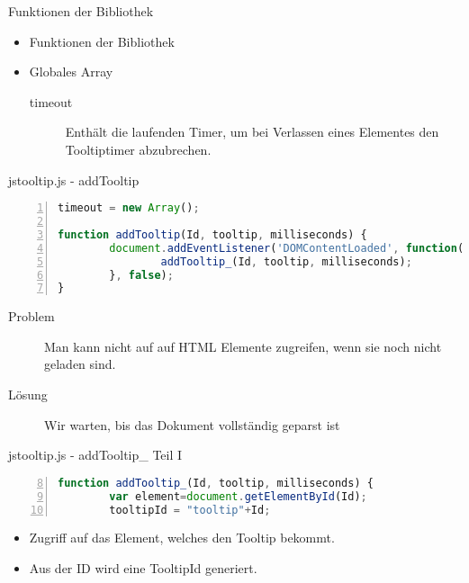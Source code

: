 \begin{frame}[<+->]{Funktionen der Bibliothek}
\begin{itemize}
\item Funktionen der Bibliothek
\normalsize
\item Globales Array
\small
\begin{description}
\item[timeout]Enthält die laufenden Timer, um bei Verlassen eines Elementes den Tooltiptimer abzubrechen.
\end{description}
\end{itemize}
\end{frame}
\begin{frame}[<+->][fragile]{jstooltip.js - addTooltip}
\tiny{\begin{lstlisting}[language=JavaScript, 
		   numbers=left,
		   numbersep=3pt,
		   breaklines=true]		 
timeout = new Array();

function addTooltip(Id, tooltip, milliseconds) {
        document.addEventListener('DOMContentLoaded', function(e){
                addTooltip_(Id, tooltip, milliseconds);
        }, false);
}
\end{lstlisting}}
\normalsize
\begin{description}
\item[Problem]Man kann nicht auf auf HTML Elemente zugreifen, wenn sie noch nicht geladen sind.
\item[Lösung]Wir warten, bis das Dokument vollständig geparst ist
\end{description}
\end{frame}
\begin{frame}[<+->][fragile]{jstooltip.js - addTooltip\_ Teil I}
\tiny{\begin{lstlisting}[language=JavaScript, 
		   numbers=left,
		   numbersep=3pt,
		   breaklines=true,
		   firstnumber=8]
function addTooltip_(Id, tooltip, milliseconds) {
        var element=document.getElementById(Id);
        tooltipId = "tooltip"+Id;
\end{lstlisting}}
\normalsize
\pause
\begin{itemize}
\item Zugriff auf das Element, welches den Tooltip bekommt.
\item Aus der ID wird eine TooltipId generiert.
\end{itemize}
\end{frame}
